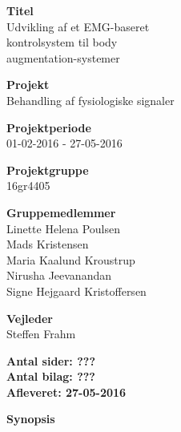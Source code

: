 \begin{minipage}[t]{0.48\textwidth}
\textbf{Titel} \\[5pt]\hspace*{2ex} 
Udvikling af et EMG-baseret \\\hspace*{2ex}
kontrolsystem til body \\\bigskip\hspace*{2ex}
augmentation-systemer 

\textbf{Projekt} \\[5pt]\bigskip\hspace*{2ex}
Behandling af fysiologiske signaler%

\textbf{Projektperiode} \\[5pt]\bigskip\hspace{2ex}
01-02-2016 - 27-05-2016

\textbf{Projektgruppe} \\[5pt]\bigskip\hspace{2ex}
16gr4405

\textbf{Gruppemedlemmer} \\[5pt]\hspace*{2ex}
Linette Helena Poulsen \\\hspace*{2ex}
Mads Kristensen \\\hspace*{2ex}
Maria Kaalund Kroustrup \\\hspace*{2ex}
Nirusha Jeevanandan \\\bigskip\hspace*{2ex}
Signe Hejgaard Kristoffersen %


\textbf{Vejleder} \\[5pt]\bigskip\hspace*{2ex}
Steffen Frahm %


\vspace*{1cm}

\textbf{Antal sider: ???} \\
\textbf{Antal bilag: ???} \\ 
\textbf{Afleveret: 27-05-2016}

\end{minipage}
\hfill
\begin{minipage}[t]{0.483\textwidth}
\textbf{Synopsis} \\[5pt]
\fbox{\parbox{8cm}{\bigskip\bigskip}}
\end{minipage}


